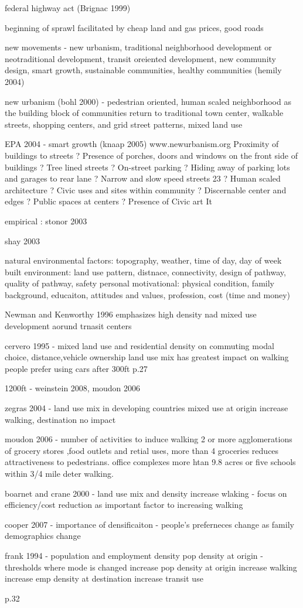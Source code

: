 federal highway act (Brignac 1999)

beginning of sprawl facilitated by cheap land and gas prices, good roads

new movements - new urbanism, traditional neighborhood development or neotraditional development, transit oreiented development, new community design, smart growth, sustainable communities, healthy communities (hemily 2004)

new urbanism (bohl 2000) - pedestrian oriented, human scaled neighborhood as the building block of communities
return to traditional town center, walkable streets, shopping centers, and grid street patterns, mixed land use

EPA 2004 - smart growth (knaap 2005)
www.newurbanism.org
Proximity of buildings to streets ? Presence of porches, doors and windows on the front side of buildings ? Tree lined streets ? On-street parking ? Hiding away of parking lots and garages to rear lane ? Narrow and slow speed streets
23
? Human scaled architecture ? Civic uses and sites within community ? Discernable center and edges ? Public spaces at centers ? Presence of Civic art
It

empirical : stonor 2003

shay 2003

natural environmental factors: topography, weather, time of day, day of week
built environment: land use pattern, distnace, connectivity, design of pathway, quality of pathway, safety
personal motivational: physical condition, family background, educaiton, attitudes and values, profession, cost (time and money)

Newman and Kenworthy 1996
emphasizes high density nad mixed use development aorund trnasit centers

cervero 1995 - mixed land use and residential density on commuting modal choice, distance,vehicle ownership
land use mix has greatest impact on walking
people prefer using cars after 300ft p.27

1200ft - weinstein 2008, moudon 2006

 zegras 2004 - land use mix in developing countries
 mixed use at origin increase walking, destination no impact
 
moudon 2006 - number of activities to induce walking
2 or more agglomerations of grocery stores ,food outlets and retial uses, more than 4 groceries reduces attractiveness to pedestrians.  office complexes more htan 9.8 acres or five schools within 3/4 mile deter walking. 

boarnet and crane 2000 - land use mix and density increase wlaking - focus on efficiency/cost reduction as important factor to increasing walking

cooper 2007 - importance of densificaiton - people's preferneces change as family demographics change

frank 1994 - population and employment density
pop density at origin - thresholds where mode is changed
increase pop density at origin increase walking
increase emp density at destination increase transit use

p.32



